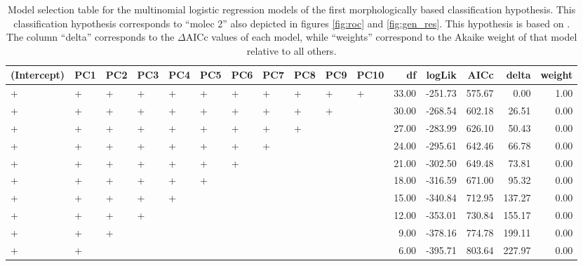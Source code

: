 \documentclass[12pt,letterpaper]{article}\usepackage{graphicx, color}
\begin{document}
\begin{table}
  \centering
{\small
\begin{tabular}{lllllllllllrrrrr}
  \hline
(Intercept) & PC1 & PC2 & PC3 & PC4 & PC5 & PC6 & PC7 & PC8 & PC9 & PC10 & df & logLik & AICc & delta & weight \\ 
  \hline
+ & + & + & + & + & + & + & + & + & + & + & 33.00 & -251.73 & 575.67 & 0.00 & 1.00 \\ 
  + & + & + & + & + & + & + & + & + & + &  & 30.00 & -268.54 & 602.18 & 26.51 & 0.00 \\ 
  + & + & + & + & + & + & + & + & + &  &  & 27.00 & -283.99 & 626.10 & 50.43 & 0.00 \\ 
  + & + & + & + & + & + & + & + &  &  &  & 24.00 & -295.61 & 642.46 & 66.78 & 0.00 \\ 
  + & + & + & + & + & + & + &  &  &  &  & 21.00 & -302.50 & 649.48 & 73.81 & 0.00 \\ 
  + & + & + & + & + & + &  &  &  &  &  & 18.00 & -316.59 & 671.00 & 95.32 & 0.00 \\ 
  + & + & + & + & + &  &  &  &  &  &  & 15.00 & -340.84 & 712.95 & 137.27 & 0.00 \\ 
  + & + & + & + &  &  &  &  &  &  &  & 12.00 & -353.01 & 730.84 & 155.17 & 0.00 \\ 
  + & + & + &  &  &  &  &  &  &  &  & 9.00 & -378.16 & 774.78 & 199.11 & 0.00 \\ 
  + & + &  &  &  &  &  &  &  &  &  & 6.00 & -395.71 & 803.64 & 227.97 & 0.00 \\ 
   \hline
\end{tabular}
}


  \caption{Model selection table for the multinomial logistic regression models of the first morphologically based classification hypothesis. This classification hypothesis corresponds to ``molec 2'' also depicted in figures \ref{fig:roc} and \ref{fig:gen_res}. This hypothesis is based on \citet{Seeliger1945}. The column ``delta'' corresponds to the \(\Delta\)AICc values of each model, while ``weights'' correspond to the Akaike weight of that model relative to all others.}
  \label{tab:mod_sel_4}
\end{table}
\end{document}
